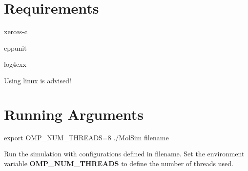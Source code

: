 \hypertarget{index_req_sec}{}\section{Requirements}\label{index_req_sec}

\begin{DoxyItemize}
\item xerces-\/c
\item cppunit
\item log4cxx
\end{DoxyItemize}

Using linux is advised!\hypertarget{index_args_sec}{}\section{Running Arguments}\label{index_args_sec}

\begin{DoxyCode}
export OMP\_NUM\_THREADS=8
./MolSim filename
\end{DoxyCode}
 Run the simulation with configurations defined in \textquotesingle{}filename\textquotesingle{}. Set the environment variable {\bfseries O\+M\+P\+\_\+\+N\+U\+M\+\_\+\+T\+H\+R\+E\+A\+DS} to define the number of threads used.


